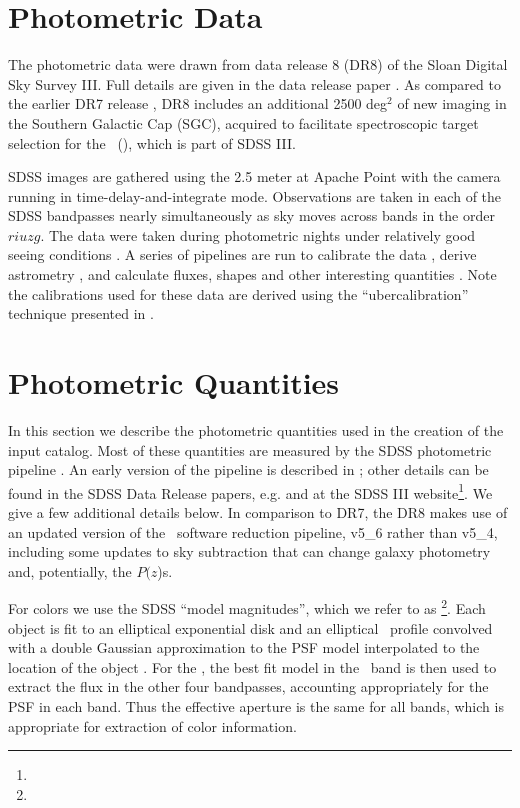 \documentclass[preprint]{aastex}
\newcommand{\pofz}{$P(z$)}
\begin{document}
\section{Photometric Data} \label{sec:data}

The photometric data were drawn from data release 8 (DR8) of the Sloan Digital
Sky Survey III.  Full details are given in the data release paper \citet{dr8}.
As compared to the earlier DR7 release \citep{dr7}, DR8 includes an additional
2500 deg$^2$ of new imaging in the Southern Galactic Cap (SGC), acquired to
facilitate spectroscopic target selection for the \bossfull\ (\boss), which is
part of SDSS III.


SDSS \citep{York00} images are gathered using the 2.5 meter at Apache Point
\citep{Gunn06} with the camera \citep{Gunn98} running in
time-delay-and-integrate mode.  Observations are taken in each of the SDSS
bandpasses \citep[{\it ugriz};][]{Fukugita96} nearly simultaneously as sky
moves across bands in the order $riuzg$.  The data were taken during
photometric nights under relatively good seeing conditions \citep{Hogg01}.  A
series of pipelines are run to calibrate the data
\citep{Nikhil08,Smith02,Tucker06}, derive astrometry \citep{Pier03}, and
calculate fluxes, shapes and other interesting quantities
\citep{LuptonADASS01}.  Note the calibrations used for these data are derived
using the ``ubercalibration'' technique presented in \citet{Nikhil08}.
\section{Photometric Quantities} \label{sec:photo}

In this section we describe the photometric quantities used in the creation of the
input catalog.  Most of these quantities are measured by the SDSS photometric
pipeline \photo. An early version of the pipeline is described in
\citet{LuptonADASS01};  other details can be found in the SDSS Data Release
papers, e.g. \citet{dr4} and at the SDSS III website\footnote{\sdssweb}.  We
 give a few additional details below.  In comparison to DR7, the DR8
makes use of an updated version of the \photo\ software reduction pipeline,
v5\_6 rather than v5\_4, including some updates to sky subtraction that can
change galaxy photometry and, potentially, the \pofz s.

For colors we use the SDSS ``model magnitudes'', which we refer to as
\modelmag \footnote{\DRatemags}.  Each object is fit to an elliptical
exponential disk and an elliptical \devauc\ profile convolved with a double
Gaussian approximation to the PSF model interpolated to the location of the
object \citep{LuptonADASS01,Sheldon04}.  For the \modelmag, the best fit model
in the \rmag\ band is then used to extract the flux in the other four
bandpasses, accounting appropriately for the PSF in each band. Thus the
effective aperture is the same for all bands, which is appropriate for
extraction of color information.
\end{document}
